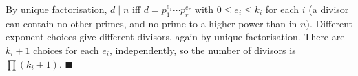 By unique factorisation, $d\mid n$ iff $d=p_1^{e_1}\cdots p_r^{e_r}$ with $0\le e_i\le k_i$ for each $i$ (a divisor can contain no other primes, and no prime to a higher power than in $n$). Different exponent choices give different divisors, again by unique factorisation. There are $k_i+1$ choices for each $e_i$, independently, so the number of divisors is $\prod(k_i+1)$. $\blacksquare$
